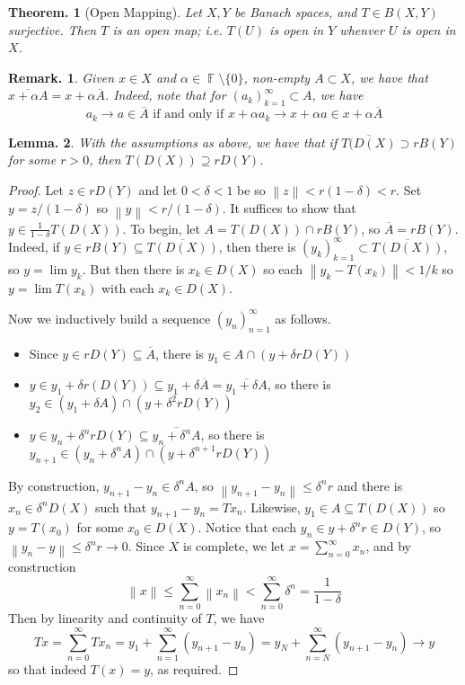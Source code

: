 \documentclass[11pt, a4paper]{memoir}
\DeclareMathOperator{\F}{{\mathbb{F}}}
\newcommand{\norm}[1]{\ensuremath{\left\lVert#1\right\rVert}}
\theoremstyle{change}
\newtheorem{theorem}{Theorem.}[section]
\newtheorem{lemma}[theorem]{Lemma.}
\theoremstyle{plain}
\theoremstyle{nonumberplain}
\newtheorem{remark}{Remark.}
\newtheorem{proof}{Proof}
\numberwithin{equation}{section}
\begin{document}
\begin{theorem}[Open Mapping]
    Let $X,Y$ be Banach spaces, and $T\in B(X,Y)$ surjective.
    Then $T$ is an open map; i.e. $T(U)$ is open in $Y$ whenver $U$ is open in $X$.
\end{theorem}
\begin{remark}
    Given $x\in X$ and $\alpha\in\F\setminus\{0\}$, non-empty $A\subset X$, we have that $\overline{x+\alpha A}=x+\alpha\overline{A}$.
    Indeed, note that for $(a_k)_{k=1}^\infty\subset A$, we have
    \begin{equation*}
        a_k\to a\in\overline{A}\text{ if and only if }x+\alpha a_k\to x+\alpha a\in x+\alpha\overline{A}
    \end{equation*}
\end{remark}
\begin{lemma}
    With the assumptions as above, we have that if $\overline{T(D(X)}\supset rB(Y)$ for some $r>0$, then $T(D(X))\supseteq rD(Y)$.
\end{lemma}
\begin{proof}
    Let $z\in rD(Y)$ and let $0<\delta<1$ be so $\norm{z}<r(1-\delta)<r$.
    Set $y=z/(1-\delta)$ so $\norm{y}<r/(1-\delta)$.
    It suffices to show that $y\in\frac{1}{1-\delta}T(D(X))$.
    To begin, let $A=T(D(X))\cap rB(Y)$, so $\overline{A}=rB(Y)$.
    Indeed, if $y\in rB(Y)\subseteq\overline{T(D(X))}$, then there is $(y_k)_{k=1}^\infty\subset\overline{T(D(X))}$, so $y=\lim y_k$.
    But then there is $x_k\in D(X)$ so each $\norm{y_k-T(x_k)}<1/k$ so $y=\lim T(x_k)$ with each $x_k\in D(X)$.

    Now we inductively build a sequence $(y_n)_{n=1}^\infty$ as follows.
    \begin{itemize}[nl]
        \item Since $y\in rD(Y)\subseteq\overline{A}$, there is $y_1\in A\cap(y+\delta rD(Y))$
        \item $y\in y_1+\delta r(D(Y))\subseteq y_1+\delta\overline{A}=\overline{y_1+\delta A}$, so there is $y_2\in(y_1+\delta A)\cap (y+\delta^2rD(Y))$
        \item $y\in y_n+\delta^n rD(Y)\subseteq\overline{y_n+\delta^nA}$, so there is $y_{n+1}\in(y_n+\delta^n A)\cap(y+\delta^{n+1}rD(Y))$
    \end{itemize}
    By construction, $y_{n+1}-y_n\in\delta^n A$, so $\norm{y_{n+1}-y_n}\leq\delta^n r$ and there is $x_n\in\delta^n D(X)$ such that $y_{n+1}-y_n=Tx_n$.
    Likewise, $y_1\in A\subseteq T(D(X))$ so $y=T(x_0)$ for some $x_0\in D(X)$.
    Notice that each $y_n\in y+\delta^nr\in D(Y)$, so $\norm{y_n-y}\leq\delta^n r\to 0$.
    Since $X$ is complete, we let $x=\sum_{n=0}^\infty x_n$, and by construction
    \begin{equation*}
        \norm{x}\leq\sum_{n=0}^\infty\norm{x_n}<\sum_{n=0}^\infty\delta^n=\frac{1}{1-\delta}
    \end{equation*}
    Then by linearity and continuity of $T$, we have
    \begin{equation*}
        Tx=\sum_{n=0}^\infty Tx_n=y_1+\sum_{n=1}^\infty(y_{n+1}-y_n)=y_N+\sum_{n=N}^\infty(y_{n+1}-y_n)\to y
    \end{equation*}
    so that indeed $T(x)=y$, as required.
\end{proof}
\end{document}
